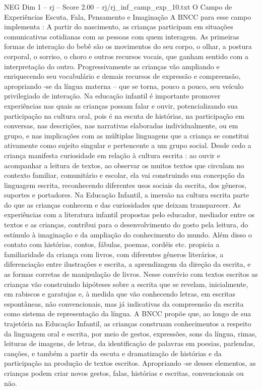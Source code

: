 \begin{textsample}{NEG Dim 1 – rj – Score 2.00 – rj/rj\_inf\_camp\_exp\_10.txt}  \label{ex:f1_neg_002}
O Campo de Experiências Escuta, Fala, Pensamento e Imaginação A BNCC para esse campo implementa : A partir do nascimento, as crianças participam em situações comunicativas cotidianas com as pessoas com quem interagem.
As primeiras formas de interação do bebê são os movimentos do seu corpo, o olhar, a postura corporal, o sorriso, o choro e outros recursos vocais, que ganham sentido com a interpretação do outro.
Progressivamente as crianças vão ampliando e enriquecendo seu vocabulário e demais recursos de expressão e compreensão, apropriando -se da língua materna – que se torna, pouco a pouco, seu veículo privilegiado de interação.
Na educação infantil é importante promover experiências nas quais as crianças possam falar e ouvir, potencializando sua participação na cultura oral, pois é na escuta de histórias, na participação em conversas, nas descrições, nas narrativas elaboradas individualmente, ou em grupo, e nas implicações com as múltiplas linguagens que a criança se constitui ativamente como sujeito singular e pertencente a um grupo social.
Desde cedo a criança manifesta curiosidade em relação à cultura escrita : ao ouvir e acompanhar a leitura de textos, ao observar os muitos textos que circulam no contexto familiar, comunitário e escolar, ela vai construindo sua concepção da linguagem escrita, reconhecendo diferentes usos sociais da escrita, dos gêneros, suportes e portadores.
Na Educação Infantil, a imersão na cultura escrita parte do que as crianças conhecem e das curiosidades que deixam transparecer.
As experiências com a literatura infantil propostas pelo educador, mediador entre os textos e as crianças, contribui para o desenvolvimento do gosto pela leitura, do estímulo à imaginação e da ampliação do conhecimento do mundo.
Além disso o contato com histórias, contos, fábulas, poemas, cordéis etc. propicia a familiaridade da criança com livros, com diferentes gêneros literários, a diferenciação entre ilustrações e escrita, a aprendizagem da direção da escrita, e as formas corretas de manipulação de livros.
Nesse convívio com textos escritos as crianças vão construindo hipóteses sobre a escrita que se revelam, inicialmente, em rabiscos e garatujas e, à medida que vão conhecendo letras, em escritas espontâneas, não convencionais, mas já indicativas da compreensão da escrita como sistema de representação da língua.
A BNCC propõe que, ao longo de sua trajetória na Educação Infantil, as crianças construam conhecimentos a respeito da linguagem oral e escrita, por meio de gestos, expressões, sons da língua, rimas, leituras de imagens, de letras, da identificação de palavras em poesias, parlendas, canções, e também a partir da escuta e dramatização de histórias e da participação na produção de textos escritos.
Apropriando -se desses elementos, as crianças podem criar novos gestos, falas, histórias e escritas, convencionais ou não.

\end{textsample}
